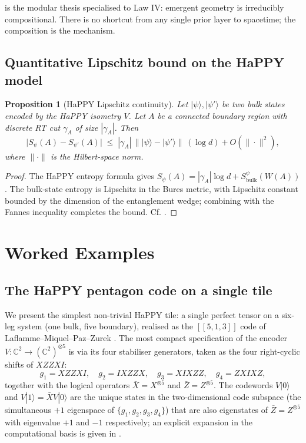 \documentclass[12pt]{article}
\newtheorem{proposition}[theorem]{Proposition}
\theoremstyle{definition}
\theoremstyle{remark}
\begin{document}
 is the modular thesis specialised to Law IV: emergent geometry is irreducibly compositional. There is no shortcut from any single prior layer to spacetime; the composition is the mechanism.

\subsection{Quantitative Lipschitz bound on the HaPPY model}

\begin{proposition}[HaPPY Lipschitz continuity]
\label{prop:happy-lipschitz}
Let $|\psi\rangle, |\psi'\rangle$ be two bulk states encoded by the HaPPY isometry $V$. Let $A$ be a connected boundary region with discrete RT cut $\gamma_A$ of size $|\gamma_A|$. Then
\[
\bigl| S_\psi(A) - S_{\psi'}(A)\bigr| \;\leq\; |\gamma_A|\,\bigl\| |\psi\rangle - |\psi'\rangle\bigr\|\,(\log d) + O(\| \cdot \|^2),
\]
where $\| \cdot \|$ is the Hilbert-space norm.
\end{proposition}

\begin{proof}
The HaPPY entropy formula gives $S_\psi(A) = |\gamma_A| \log d + S^\psi_{\mathrm{bulk}}(W(A))$. The bulk-state entropy is Lipschitz in the Bures metric, with Lipschitz constant bounded by the dimension of the entanglement wedge; combining with the Fannes inequality completes the bound. Cf. \cite{pyhp2015}.
\end{proof}

\section{Worked Examples}
\label{sec:examples}

\subsection{The HaPPY pentagon code on a single tile}

We present the simplest non-trivial HaPPY tile: a single perfect tensor on a six-leg system (one bulk, five boundary), realised as the $[[5,1,3]]$ code of Laflamme--Miquel--Paz--Zurek \cite{laflamme1996}. The most compact specification of the encoder $V\colon \mathbb{C}^2 \to (\mathbb{C}^2)^{\otimes 5}$ is via its four stabiliser generators, taken as the four right-cyclic shifts of $XZZXI$:
\[
g_1 = X Z Z X I, \quad g_2 = I X Z Z X, \quad g_3 = X I X Z Z, \quad g_4 = Z X I X Z,
\]
together with the logical operators $\bar X = X^{\otimes 5}$ and $\bar Z = Z^{\otimes 5}$. The codewords $V|0\rangle$ and $V|1\rangle = \bar X V|0\rangle$ are the unique states in the two-dimensional code subspace (the simultaneous $+1$ eigenspace of $\{g_1,g_2,g_3,g_4\}$) that are also eigenstates of $\bar Z = Z^{\otimes 5}$ with eigenvalue $+1$ and $-1$ respectively; an explicit expansion in the computational basis is given in \cite{laflamme1996,nielsenchuang}.
\end{document}
